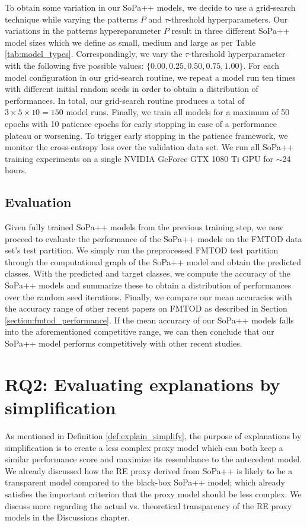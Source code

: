 To obtain some variation in our SoPa++ models, we decide to use a grid-search
technique while varying the patterns $P$ and $\tau$-threshold hyperparameters.
Our variations in the patterns hypereparameter $P$ result in three different
SoPa++ model sizes which we define as small, medium and large as per Table
\ref{tab:model_types}. Correspondingly, we vary the $\tau$-threshold
hyperparameter with the following five possible values: $\{0.00, 0.25, 0.50,
0.75, 1.00\}$. For each model configuration in our grid-search routine, we
repeat a model run ten times with different initial random seeds in order to
obtain a distribution of performances. In total, our grid-search routine
produces a total of $3\times5\times10=150$ model runs. Finally, we train all
models for a maximum of 50 epochs with 10 patience epochs for early stopping in
case of a performance plateau or worsening. To trigger early stopping in the
patience framework, we monitor the cross-entropy loss over the validation data
set. We run all SoPa++ training experiments on a single NVIDIA GeForce GTX 1080
Ti GPU for $\sim$24 hours.

\subsection{Evaluation}

Given fully trained SoPa++ models from the previous training step, we now
proceed to evaluate the performance of the SoPa++ models on the FMTOD data set's
test partition. We simply run the preprocessed FMTOD test partition through the
computational graph of the SoPa++ model and obtain the predicted classes. With
the predicted and target classes, we compute the accuracy of the SoPa++ models
and summarize these to obtain a distribution of performances over the random
seed iterations. Finally, we compare our mean accuracies with the accuracy range
of other recent papers on FMTOD as described in Section
\ref{section:fmtod_performance}. If the mean accuracy of our SoPa++ models
falls into the aforementioned competitive range, we can then conclude that our
SoPa++ model performs competitively with other recent studies.

\section{RQ2: Evaluating explanations by simplification}

\label{section:evaluate_explain}

As mentioned in Definition \ref{def:explain_simplify}, the purpose of
explanations by simplification is to create a less complex proxy model which can
both keep a similar performance score and maximize its resemblance to the
antecedent model. We already discussed how the RE proxy derived from SoPa++ is
likely to be a transparent model compared to the black-box SoPa++ model; which
already satisfies the important criterion that the proxy model should be less
complex. We discuss more regarding the actual vs. theoretical transparency of
the RE proxy models in the Discussions chapter.

